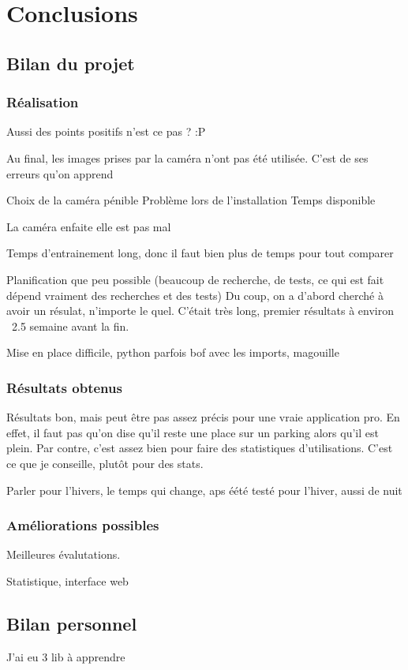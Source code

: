 \chapter{Conclusions}
\section{Bilan du projet}
\subsection{Réalisation}



Aussi des points positifs n'est ce pas ? :P

Au final, les images prises par la caméra n'ont pas été utilisée.
C'est de ses erreurs qu'on apprend

Choix de la caméra pénible
Problème lors de l'installation
Temps disponible

La caméra enfaite elle est pas mal

Temps d'entrainement long, donc il faut bien plus de temps pour tout comparer

Planification que peu possible (beaucoup de recherche, de tests, ce qui est fait dépend vraiment des recherches et des tests) Du coup, on a d'abord cherché à avoir un résulat, n'importe le quel. C'était très long, premier résultats à environ ~2.5 semaine avant la fin.

Mise en place difficile, python parfois bof avec les imports, magouille



\subsection{Résultats obtenus}

Résultats bon, mais peut être pas assez précis pour une vraie application pro. En effet, il faut pas qu'on dise qu'il reste une place sur un parking alors qu'il est plein. Par contre, c'est assez bien pour faire des statistiques d'utilisations. C'est ce que je conseille, plutôt pour des stats.

Parler pour l'hivers, le temps qui change, aps éété testé pour l'hiver, aussi de nuit

\subsection{Améliorations possibles}

Meilleures évalutations. 

Statistique, interface web
\section{Bilan personnel}


J'ai eu 3 lib à apprendre
